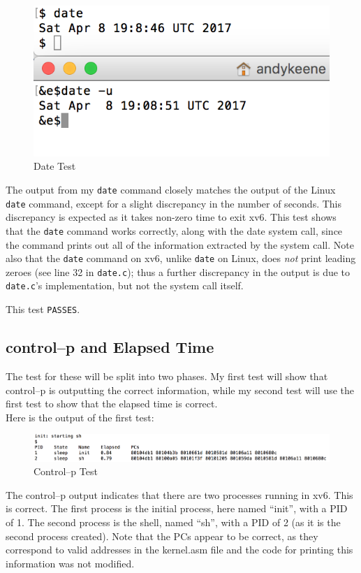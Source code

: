 \documentclass[11pt,letterpaper]{report}
\begin{document}
\begin{figure}[h!]
\centering
\includegraphics[width=0.4\linewidth]{date.png}
\caption[Date test]{Date Test}
\label{fig:datetest}
\end{figure}	
	
	The output from my {\tt date} command closely matches the output of the Linux {\tt date} command, except for a slight discrepancy in the number of seconds. This discrepancy is expected as it takes non-zero time to exit xv6. This test shows that the {\tt date} command works correctly, along with the date system call, since the command prints out all of the information extracted by the system call. Note also that the {\tt date} command on xv6, unlike {\tt date} on Linux, does \emph{not} print leading zeroes (see line 32 in {\tt date.c}); thus a further discrepancy in the output is due to {\tt date.c}'s implementation, but not the system call itself.
	
	This test {\tt PASSES}.
	
	\subsection*{control--p and Elapsed Time}
	The test for these will be split into two phases. My first test will show that control--p is outputting the correct information, while my second test will use the first test to show that the elapsed time is correct. \\
	
	\noindent Here is the output of the first test:

\begin{figure}[h]
\centering
\includegraphics[width=0.8\linewidth]{ctrl-p-test1.png}
\caption[ctl-p test]{Control--p Test}
\label{fig:ctl-p_1}
\end{figure}	
	
	 The control--p output indicates that there are two processes running in xv6. This is correct. The first process is the initial process, here named ``init'', with a PID of 1. The second process is the shell, named ``sh'', with a PID of 2 (as it is the second process created). Note that the PCs appear to be correct, as they correspond to valid addresses in the kernel.asm file and the code for printing this information was not modified. 
	
\end{document}
